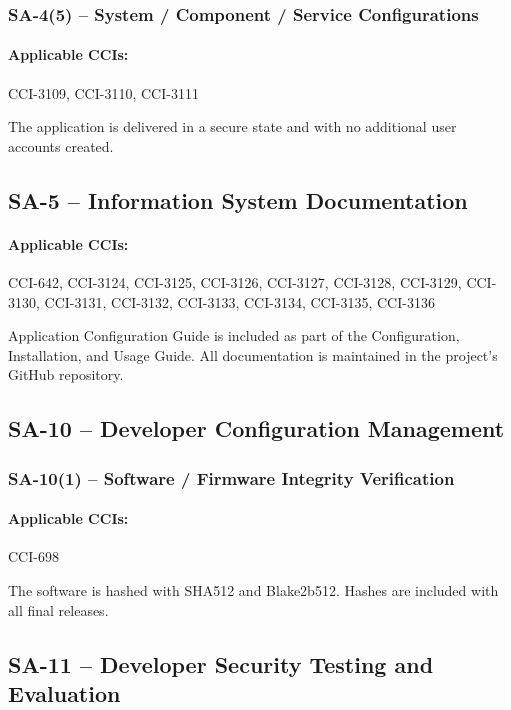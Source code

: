\documentclass[letterpaper, 10pt, twoside]{article}
\begin{document}
\subsubsection{SA-4(5) -- System / Component / Service Configurations}

\paragraph{Applicable CCIs:} CCI-3109, CCI-3110, CCI-3111

The application is delivered in a secure state and with no additional user accounts created.

\subsection{SA-5 -- Information System Documentation}

\paragraph{Applicable CCIs:} CCI-642, CCI-3124, CCI-3125, CCI-3126, CCI-3127, CCI-3128, CCI-3129, CCI-3130, CCI-3131, CCI-3132, CCI-3133, CCI-3134, CCI-3135, CCI-3136

Application Configuration Guide is included as part of the Configuration, Installation, and Usage Guide. All documentation is maintained in the project's GitHub repository.

\subsection{SA-10 -- Developer Configuration Management}

\subsubsection{SA-10(1) -- Software / Firmware Integrity Verification}

\paragraph{Applicable CCIs:} CCI-698

The software is hashed with SHA512 and Blake2b512. Hashes are included with all final releases.

\subsection{SA-11 -- Developer Security Testing and Evaluation}
\label{sec:sa-11}
\end{document}
